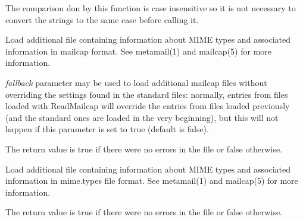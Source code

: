 The comparison don by this function is case insensitive so it is not
necessary to convert the strings to the same case before calling it.

\label{wxmimetypesmanagerreadmailcap}


Load additional file containing information about MIME types and associated
information in mailcap format. See metamail(1) and mailcap(5) for more
information.

{\it fallback} parameter may be used to load additional mailcap files without
overriding the settings found in the standard files: normally, entries from
files loaded with ReadMailcap will override the entries from files loaded
previously (and the standard ones are loaded in the very beginning), but this
will not happen if this parameter is set to true (default is false).

The return value is true if there were no errors in the file or false
otherwise.

\label{wxmimetypesmanagerreadmimetypes}


Load additional file containing information about MIME types and associated
information in mime.types file format. See metamail(1) and mailcap(5) for more
information.

The return value is true if there were no errors in the file or false
otherwise.

